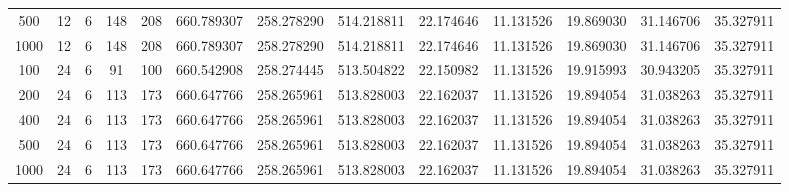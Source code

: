 \begin{table}[h]
\begin{tabular}{ccccccccccccc}
500 & 12 & 6 & 148 & 208 & 660.789307 & 258.278290 & 514.218811 & 22.174646 & 11.131526 & 19.869030 & 31.146706 & 35.327911 \\
1000 & 12 & 6 & 148 & 208 & 660.789307 & 258.278290 & 514.218811 & 22.174646 & 11.131526 & 19.869030 & 31.146706 & 35.327911 \\
100 & 24 & 6 & 91 & 100 & 660.542908 & 258.274445 & 513.504822 & 22.150982 & 11.131526 & 19.915993 & 30.943205 & 35.327911 \\
200 & 24 & 6 & 113 & 173 & 660.647766 & 258.265961 & 513.828003 & 22.162037 & 11.131526 & 19.894054 & 31.038263 & 35.327911 \\
400 & 24 & 6 & 113 & 173 & 660.647766 & 258.265961 & 513.828003 & 22.162037 & 11.131526 & 19.894054 & 31.038263 & 35.327911 \\
500 & 24 & 6 & 113 & 173 & 660.647766 & 258.265961 & 513.828003 & 22.162037 & 11.131526 & 19.894054 & 31.038263 & 35.327911 \\
1000 & 24 & 6 & 113 & 173 & 660.647766 & 258.265961 & 513.828003 & 22.162037 & 11.131526 & 19.894054 & 31.038263 & 35.327911 \\
\bottomrule
\end{tabular}
\end{table}
